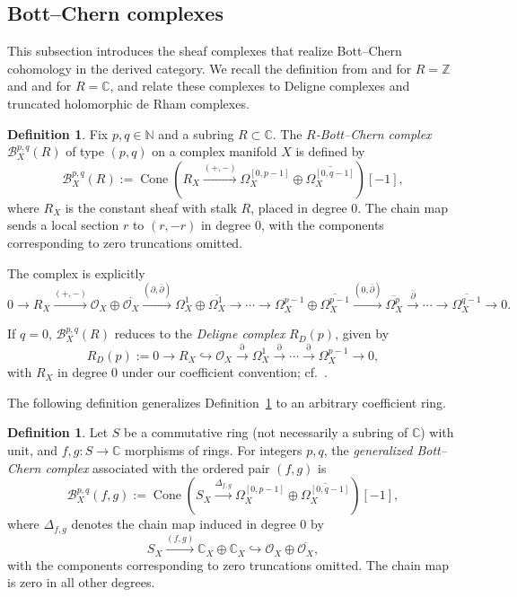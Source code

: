 \documentclass[11pt]{amsart}
\numberwithin{equation}{section}
\theoremstyle{plain}
\theoremstyle{definition}
\newtheorem{De}[thm]{Definition}
\begin{document}
\subsection{Bott--Chern complexes}

This subsection introduces the sheaf complexes that realize Bott--Chern
cohomology in the derived category.  We recall the definition from
\cite[\S~3]{CSY} and \cite[Definition~1]{Wu} for $R=\mathbb Z$ and
\cite[Definition~2.2]{SY} and \cite[\S~2.2]{YY20} for $R=\mathbb C$,
and relate these complexes to Deligne complexes and truncated holomorphic
de Rham complexes.
\begin{De}\label{def-bc-coefficient-ring}
Fix $p,q\in\mathbb N$ and a subring $R\subset\mathbb C$.
The \emph{$R$-Bott--Chern complex} $\mathcal B_X^{p,q}(R)$ of type $(p,q)$ on a
complex manifold $X$ is defined by
\[
\mathcal B_X^{p,q}(R):=
\operatorname{Cone}\!\left(R_X\xrightarrow{(+,-)}
\Omega_X^{[0,p-1]}\oplus\overline{\Omega_X^{[0,q-1]}}\right)[-1],
\]
where $R_X$ is the constant sheaf with stalk $R$, placed in degree $0$.
The chain map sends a local section $r$ to $(r,-r)$ in degree $0$,
with the components corresponding to zero truncations omitted.
\end{De}

The complex is explicitly
{\small
\[
0 \longrightarrow R_X
\stackrel{(+,-)}{\longrightarrow} \mathcal O_X\oplus\overline{\mathcal O_X}
\stackrel{(\partial,\bar\partial)}{\longrightarrow}
\Omega_X^1\oplus\overline{\Omega_X^1}
\longrightarrow\cdots
\longrightarrow\Omega_X^{p-1}\oplus\overline{\Omega_X^{p-1}}
\stackrel{(0,\bar\partial)}{\longrightarrow}\overline{\Omega_X^p}
\stackrel{\bar\partial}{\longrightarrow}\cdots
\longrightarrow\overline{\Omega_X^{q-1}}\longrightarrow 0.
\]
}

If $q=0$, $\mathcal B_X^{p,q}(R)$ reduces to the \emph{Deligne complex}
$R_D(p)$, given by
\[
R_D(p):=0\longrightarrow R_X\hookrightarrow\mathcal O_X
\xrightarrow{\partial}\Omega_X^1\xrightarrow{\partial}\cdots
\xrightarrow{\partial}\Omega_X^{p-1}\longrightarrow0,
\]
with $R_X$ in degree $0$ under our coefficient convention;
cf.\ \cite[\S~3]{Wu}.

The following definition generalizes Definition~\ref{def-bc-coefficient-ring}
to an arbitrary coefficient ring.
\begin{De}\label{def-generalized-bc-complex}
Let $S$ be a commutative ring (not necessarily a subring of
$\mathbb C$) with unit, and $f,g:S\longrightarrow\mathbb C$
morphisms of rings. For integers $p,q$, the \emph{generalized Bott--Chern
complex} associated with the ordered pair $(f,g)$ is
\[
\mathcal B_X^{p,q}(f,g):=
\operatorname{Cone}\!\left(S_X\xrightarrow{\Delta_{f,g}}
\Omega_X^{[0,p-1]}\oplus\overline{\Omega_X^{[0,q-1]}}\right)[-1],
\]
where $\Delta_{f,g}$ denotes the chain map induced in degree $0$ by
\[
S_X\xrightarrow{(f,g)}\mathbb C_X\oplus\mathbb C_X
\hookrightarrow\mathcal O_X\oplus\overline{\mathcal O_X},
\]
with the components corresponding to zero truncations omitted.
The chain map is zero in all other degrees.
\end{De}
\end{document}

